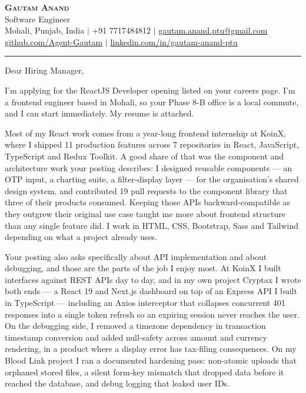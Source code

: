 \documentclass[letterpaper,11pt]{article}
\begin{document}
\begin{center}
    \textbf{\Huge \scshape Gautam Anand} \\ \vspace{2pt}
    \small Software Engineer \\ \vspace{2pt}
    \small Mohali, Punjab, India $|$ +91 7717484812 $|$
    \href{mailto:gautam.anand.ptu@gmail.com}{\underline{gautam.anand.ptu@gmail.com}} \\ \vspace{1pt}
    \small \href{https://github.com/Agent-Gautam}{\underline{github.com/Agent-Gautam}} $|$
    \href{https://www.linkedin.com/in/gautam-anand-ptu}{\underline{linkedin.com/in/gautam-anand-ptu}}
\end{center}

\vspace{6pt}
\hrule
\vspace{10pt}

Dear Hiring Manager,

I'm applying for the ReactJS Developer opening listed on your careers page. I'm a frontend engineer based in Mohali, so your Phase 8-B office is a local commute, and I can start immediately. My resume is attached.

Most of my React work comes from a year-long frontend internship at KoinX, where I shipped 11 production features across 7 repositories in React, JavaScript, TypeScript and Redux Toolkit. A good share of that was the component and architecture work your posting describes: I designed reusable components --- an OTP input, a charting suite, a filter-display layer --- for the organisation's shared design system, and contributed 19 pull requests to the component library that three of their products consumed. Keeping those APIs backward-compatible as they outgrew their original use case taught me more about frontend structure than any single feature did. I work in HTML, CSS, Bootstrap, Sass and Tailwind depending on what a project already uses.

Your posting also asks specifically about API implementation and about debugging, and those are the parts of the job I enjoy most. At KoinX I built interfaces against REST APIs day to day, and in my own project Cryptax I wrote both ends --- a React 19 and Next.js dashboard on top of an Express API I built in TypeScript --- including an Axios interceptor that collapses concurrent 401 responses into a single token refresh so an expiring session never reaches the user. On the debugging side, I removed a timezone dependency in transaction timestamp conversion and added null-safety across amount and currency rendering, in a product where a display error has tax-filing consequences. On my Blood Link project I ran a documented hardening pass: non-atomic uploads that orphaned stored files, a silent form-key mismatch that dropped data before it reached the database, and debug logging that leaked user IDs.
\end{document}
